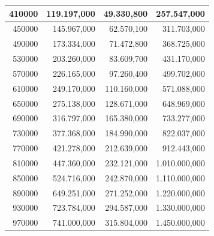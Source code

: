 \documentclass[a4paper, 12pt]{article}
\begin{document}
\begin{longtable}[c]{rrrr}
	\multicolumn{1}{|r|}{410000}                  & \multicolumn{1}{r|}{119.197,000}       & \multicolumn{1}{r|}{49.330,800}        & \multicolumn{1}{r|}{257.547,000}    \\ \hline
	\multicolumn{1}{|r|}{450000}                  & \multicolumn{1}{r|}{145.967,000}       & \multicolumn{1}{r|}{62.570,100}        & \multicolumn{1}{r|}{311.703,000}    \\ \hline
	\multicolumn{1}{|r|}{490000}                  & \multicolumn{1}{r|}{173.334,000}       & \multicolumn{1}{r|}{71.472,800}        & \multicolumn{1}{r|}{368.725,000}    \\ \hline
	\multicolumn{1}{|r|}{530000}                  & \multicolumn{1}{r|}{203.260,000}       & \multicolumn{1}{r|}{83.609,700}        & \multicolumn{1}{r|}{431.170,000}    \\ \hline
	\multicolumn{1}{|r|}{570000}                  & \multicolumn{1}{r|}{226.165,000}       & \multicolumn{1}{r|}{97.260,400}        & \multicolumn{1}{r|}{499.702,000}    \\ \hline
	\multicolumn{1}{|r|}{610000}                  & \multicolumn{1}{r|}{249.170,000}       & \multicolumn{1}{r|}{110.160,000}       & \multicolumn{1}{r|}{571.088,000}    \\ \hline
	\multicolumn{1}{|r|}{650000}                  & \multicolumn{1}{r|}{275.138,000}       & \multicolumn{1}{r|}{128.671,000}       & \multicolumn{1}{r|}{648.969,000}    \\ \hline
	\multicolumn{1}{|r|}{690000}                  & \multicolumn{1}{r|}{316.797,000}       & \multicolumn{1}{r|}{165.380,000}       & \multicolumn{1}{r|}{733.277,000}    \\ \hline
	\multicolumn{1}{|r|}{730000}                  & \multicolumn{1}{r|}{377.368,000}       & \multicolumn{1}{r|}{184.990,000}       & \multicolumn{1}{r|}{822.037,000}    \\ \hline
	\multicolumn{1}{|r|}{770000}                  & \multicolumn{1}{r|}{421.278,000}       & \multicolumn{1}{r|}{212.639,000}       & \multicolumn{1}{r|}{912.443,000}    \\ \hline
	\multicolumn{1}{|r|}{810000}                  & \multicolumn{1}{r|}{447.360,000}       & \multicolumn{1}{r|}{232.121,000}       & \multicolumn{1}{r|}{1.010.000,000}  \\ \hline
	\multicolumn{1}{|r|}{850000}                  & \multicolumn{1}{r|}{524.716,000}       & \multicolumn{1}{r|}{242.870,000}       & \multicolumn{1}{r|}{1.110.000,000}  \\ \hline
	\multicolumn{1}{|r|}{890000}                  & \multicolumn{1}{r|}{649.251,000}       & \multicolumn{1}{r|}{271.252,000}       & \multicolumn{1}{r|}{1.220.000,000}  \\ \hline
	\multicolumn{1}{|r|}{930000}                  & \multicolumn{1}{r|}{723.784,000}       & \multicolumn{1}{r|}{294.587,000}       & \multicolumn{1}{r|}{1.330.000,000}  \\ \hline
	\multicolumn{1}{|r|}{970000}                  & \multicolumn{1}{r|}{741.000,000}       & \multicolumn{1}{r|}{315.804,000}       & \multicolumn{1}{r|}{1.450.000,000}  \\ \hline
\end{longtable}
\end{document}
